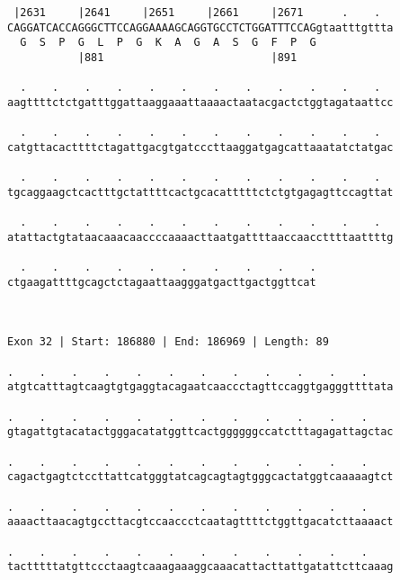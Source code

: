 \documentclass{article}
\begin{document}
\begin{Verbatim}
 |2631     |2641     |2651     |2661     |2671      .    .  
CAGGATCACCAGGGCTTCCAGGAAAAGCAGGTGCCTCTGGATTTCCAGgtaatttgttta
  G  S  P  G  L  P  G  K  A  G  A  S  G  F  P  G            
           |881                          |891               
  
  .    .    .    .    .    .    .    .    .    .    .    .  
aagttttctctgatttggattaaggaaattaaaactaatacgactctggtagataattcc
                                                            
  .    .    .    .    .    .    .    .    .    .    .    .  
catgttacacttttctagattgacgtgatcccttaaggatgagcattaaatatctatgac
                                                            
  .    .    .    .    .    .    .    .    .    .    .    .  
tgcaggaagctcactttgctattttcactgcacatttttctctgtgagagttccagttat
                                                            
  .    .    .    .    .    .    .    .    .    .    .    .  
atattactgtataacaaacaaccccaaaacttaatgattttaaccaaccttttaattttg
                                                            
  .    .    .    .    .    .    .    .    .    .
ctgaagattttgcagctctagaattaagggatgacttgactggttcat
                                                
                                                
 
Exon 32 | Start: 186880 | End: 186969 | Length: 89
 
.    .    .    .    .    .    .    .    .    .    .    .    
atgtcatttagtcaagtgtgaggtacagaatcaaccctagttccaggtgagggttttata
                                                            
.    .    .    .    .    .    .    .    .    .    .    .    
gtagattgtacatactgggacatatggttcactggggggccatctttagagattagctac
                                                            
.    .    .    .    .    .    .    .    .    .    .    .    
cagactgagtctccttattcatgggtatcagcagtagtgggcactatggtcaaaaagtct
                                                            
.    .    .    .    .    .    .    .    .    .    .    .    
aaaacttaacagtgccttacgtccaaccctcaatagttttctggttgacatcttaaaact
                                                            
.    .    .    .    .    .    .    .    .    .    .    .    
tactttttatgttccctaagtcaaagaaaggcaaacattacttattgatattcttcaaag
                                                            

\end{Verbatim}
\end{document}
